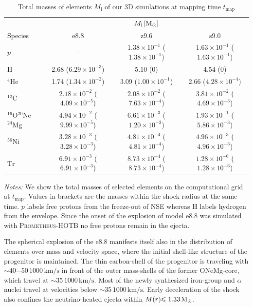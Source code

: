 \documentclass[fleqn,usenatbib]{mnras}
\newcommand{\hydrogen}{\ensuremath{\mathrm{H}}\xspace}
\newcommand{\helium}{\ensuremath{\mathrm{^{4}He}}\xspace}
\newcommand{\carbon}{\ensuremath{\mathrm{^{12}C}}\xspace}
\newcommand{\oxygen}{\ensuremath{\mathrm{^{16}O}}\xspace}
\newcommand{\neon}{\ensuremath{\mathrm{^{20}Ne}}\xspace}
\newcommand{\magnesium}{\ensuremath{\mathrm{^{24}Mg}}\xspace}
\newcommand{\nickel}{\ensuremath{\mathrm{^{56}Ni}}\xspace}
\newcommand{\tracer}{\ensuremath{\mathrm{Tr}}\xspace}
\newcommand{\solm}{\ensuremath{\rm{M_{\odot}}}\xspace}
\newcommand{\prom}{\textsc{Prometheus-HOTB}\xspace}
\newcommand{\onemg}{\ensuremath{\mathrm{e8.8}}\xspace}
\newcommand{\snine}{\ensuremath{\mathrm{s9.0}}\xspace}
\newcommand{\znine}{\ensuremath{\mathrm{z9.6}}\xspace}
\begin{document}
\begin{table}
    \centering
    \caption{Total masses of elements $M_\mathrm{i}$ of our 3D simulations at mapping time $t_{\mathrm{map}}$}
    \label{tab:composition tmap}
    \begin{tabular}{l|ccc}
        &
        \multicolumn{3}{c}{$M_{\mathrm{i}}\,[\solm] $}  \\
         Species &
        \onemg &
        \znine &
        \snine \\
         \hline 
    $p$                    & -                                         &  $1.38\times10^{-1}$ ($1.38\times10^{-1}$) & $1.63\times10^{-1}$ ($1.63\times10^{-1}$) \\
    \hydrogen              & 2.68                ($6.29\times10^{-3}$) & 5.10 (0) & 4.54 ($0$)                                \\
    \helium                & 1.74                ($1.34\times10^{-2}$) & 3.09 ($1.00\times10^{-1}$)  & 2.66 ($4.28\times10^{-4}$)               \\
    \carbon                & $2.18\times10^{-2}$ ($4.09\times10^{-5}$) &  $2.08\times10^{-2}$ ($7.63\times10^{-4}$)& $3.81\times10^{-2}$ ($4.69\times10^{-3}$) \\
    \oxygen\neon\magnesium & $4.94\times10^{-2}$ ($9.99\times10^{-5}$) &  $6.61\times10^{-3}$ ($1.20\times10^{-3}$)& $1.93\times10^{-1}$ ($5.86\times10^{-3}$)\\
    \nickel                & $3.28\times10^{-3}$ ($3.28\times10^{-3}$) &  $4.81\times10^{-4}$ ($4.81\times10^{-4}$)& $4.96\times10^{-3}$ ($4.96\times10^{-3}$)\\
    \tracer                & $6.91\times10^{-3}$ ($6.91\times10^{-3}$) &  $8.73\times10^{-4}$ ($8.73\times10^{-4}$)& $1.28\times10^{-6}$ ($1.28\times10^{-6}$)\\
    \end{tabular}
\flushleft
\textit{Notes:} We show the total masses of selected elements on the computational grid at $t_{\mathrm{map}}$. Values in brackets are the masses within the shock radius at the same time. $p$ labels free protons from the freeze-out of NSE whereas \hydrogen labels hydrogen from the envelope. Since 
the onset of the explosion of model \onemg was simulated with \prom no free protons remain in the 
ejecta.
\end{table}

The spherical explosion of the \onemg manifests itself also in the distribution of elements over mass and velocity space, where the initial shell-like structure of the progenitor is maintained.
The thin carbon-shell of the progenitor is traveling with $\sim 40\mathord{-}50\,\mathrm{1000\,km/s}$ in front of the outer mass-shells of the former ONeMg-core, which travel at $\sim 35\,\mathrm{1000\,km/s}$. Most of the newly synthesized iron-group and $\alpha$ nuclei travel at velocities below $\sim 35\,\mathrm{1000\,km/s}$.
Early deceleration of the shock also confines the neutrino-heated ejecta within $M(r)\mathord{\le 1.33}\,\solm$.
\end{document}
